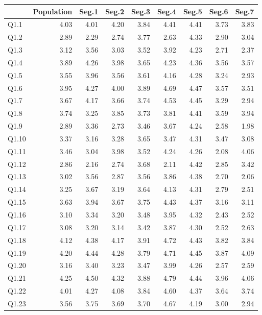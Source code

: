\documentclass[
]{article}
\begin{document}
\begin{center}
\begin{longtable}{lrrrrrrrr}
\toprule
  & Population & Seg.1 & Seg.2 & Seg.3 & Seg.4 & Seg.5 & Seg.6 & Seg.7\\
\midrule
Q1.1 & 4.03 & 4.01 & 4.20 & 3.84 & 4.41 & 4.41 & 3.73 & 3.83\\
Q1.2 & 2.89 & 2.29 & 2.74 & 3.77 & 2.63 & 4.33 & 2.90 & 3.04\\
Q1.3 & 3.12 & 3.56 & 3.03 & 3.52 & 3.92 & 4.23 & 2.71 & 2.37\\
Q1.4 & 3.89 & 4.26 & 3.98 & 3.65 & 4.23 & 4.36 & 3.56 & 3.57\\
Q1.5 & 3.55 & 3.96 & 3.56 & 3.61 & 4.16 & 4.28 & 3.24 & 2.93\\
\addlinespace
Q1.6 & 3.95 & 4.27 & 4.00 & 3.89 & 4.69 & 4.47 & 3.57 & 3.51\\
Q1.7 & 3.67 & 4.17 & 3.66 & 3.74 & 4.53 & 4.45 & 3.29 & 2.94\\
Q1.8 & 3.74 & 3.25 & 3.85 & 3.73 & 3.81 & 4.41 & 3.59 & 3.94\\
Q1.9 & 2.89 & 3.36 & 2.73 & 3.46 & 3.67 & 4.24 & 2.58 & 1.98\\
Q1.10 & 3.37 & 3.16 & 3.28 & 3.65 & 3.47 & 4.31 & 3.47 & 3.08\\
\addlinespace
Q1.11 & 3.46 & 3.04 & 3.98 & 3.52 & 4.24 & 4.26 & 2.08 & 4.06\\
Q1.12 & 2.86 & 2.16 & 2.74 & 3.68 & 2.11 & 4.42 & 2.85 & 3.42\\
Q1.13 & 3.02 & 3.56 & 2.87 & 3.56 & 3.86 & 4.38 & 2.70 & 2.06\\
Q1.14 & 3.25 & 3.67 & 3.19 & 3.64 & 4.13 & 4.31 & 2.79 & 2.51\\
Q1.15 & 3.63 & 3.94 & 3.67 & 3.75 & 4.43 & 4.37 & 3.16 & 3.11\\
\addlinespace
Q1.16 & 3.10 & 3.34 & 3.20 & 3.48 & 3.95 & 4.32 & 2.43 & 2.52\\
Q1.17 & 3.08 & 3.20 & 3.14 & 3.42 & 3.87 & 4.30 & 2.52 & 2.63\\
Q1.18 & 4.12 & 4.38 & 4.17 & 3.91 & 4.72 & 4.43 & 3.82 & 3.84\\
Q1.19 & 4.20 & 4.44 & 4.28 & 3.79 & 4.71 & 4.45 & 3.87 & 4.09\\
Q1.20 & 3.16 & 3.40 & 3.23 & 3.47 & 3.99 & 4.26 & 2.57 & 2.59\\
\addlinespace
Q1.21 & 4.25 & 4.50 & 4.32 & 3.88 & 4.79 & 4.44 & 3.96 & 4.06\\
Q1.22 & 4.01 & 4.27 & 4.08 & 3.84 & 4.60 & 4.37 & 3.64 & 3.74\\
Q1.23 & 3.56 & 3.75 & 3.69 & 3.70 & 4.67 & 4.19 & 3.00 & 2.94\\

\end{longtable}
\end{center}
\end{document}
